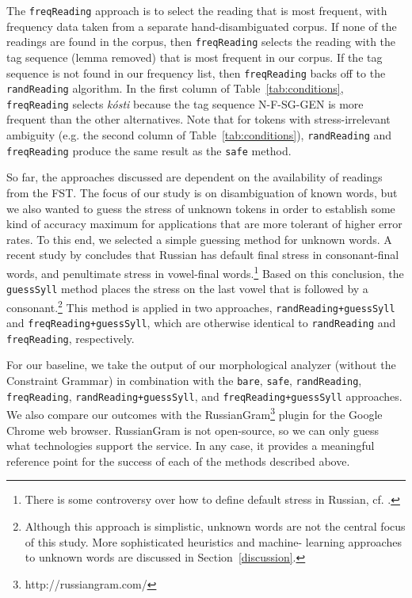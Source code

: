 \documentclass[11pt]{article}
\newcommand{\rr}[1]{\marginpar{\scriptsize R: #1}} %
\begin{document}
The {\small {\tt freqReading}} 
approach is to select the reading that is most frequent, with frequency data
taken from a separate hand-disambiguated corpus. If none of the readings are 
found in the corpus, then {\small {\tt freqReading}} selects the reading
with the tag sequence (lemma removed) that is most frequent in our corpus. If the 
tag sequence is not found
in our frequency list, then {\small {\tt freqReading}} backs off to the 
{\small {\tt randReading}} algorithm. In the first column of
Table~\ref{tab:conditions}, {\small {\tt freqReading}} selects \emph{kósti} 
because the tag sequence N-F-SG-GEN is more frequent than the
other alternatives. Note 
that for tokens with stress-irrelevant ambiguity (e.g. the second column of
Table~\ref{tab:conditions}), {\small {\tt randReading}} and 
{\small {\tt freqReading}} produce the same result as the {\small {\tt safe}} 
method.

So far, the approaches discussed are dependent on the availability of readings 
from the FST. The focus of our study is on disambiguation of known 
words, but we also wanted to guess the stress of unknown tokens in order to 
establish some kind of accuracy maximum for applications that are more tolerant 
of higher error rates. To this end, we selected a simple guessing method for 
unknown words. A recent study by  concludes that 
Russian has default final stress in consonant-final words, and penultimate stress 
in vowel-final words.\footnote{There is some controversy over how to define 
default stress in Russian, cf. .} Based on this 
conclusion, the {\tt guessSyll} method places the stress on the last vowel that 
is followed by a consonant.\footnote{Although this approach is simplistic, 
unknown words are not the central focus 
of this study. More sophisticated heuristics and machine-
learning approaches to unknown words are discussed in Section~\ref{discussion}.} This method 
is applied in two approaches, {\small {\tt randReading+guessSyll}} 
and {\small {\tt freqReading+guessSyll}}, which are otherwise identical to 
{\small {\tt randReading}} and {\small {\tt freqReading}}, respectively.

For our baseline, we take the output of our morphological analyzer (without the 
Constraint Grammar) in combination with the {\small {\tt bare}}, 
{\small {\tt safe}}, {\small {\tt randReading}}, {\small {\tt freqReading}}, 
{\small {\tt randReading+guessSyll}}, and {\small {\tt freqReading+guessSyll}} approaches. We also 
compare our outcomes with the RussianGram\footnote{http://russiangram.com/} 
plugin for the Google Chrome web browser. RussianGram is not open-source, so we
can only guess what technologies support the service. In any case, it provides a
meaningful reference point for the success of each of the methods described 
above.
\end{document}
